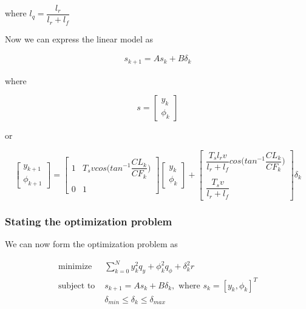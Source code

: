\documentclass[oneside,12pt]{article}
\begin{document}
    where $l_q = \dfrac{l_r}{l_r + l_f}$




  Now we can express the linear model as

    \begin{align}
      s_{k+1} = A s_k + B \delta_k
    \end{align}

    where

    \begin{equation}
      s=
      \begin{bmatrix}
        y_{k} \\
        \phi_{k}
      \end{bmatrix}
    \end{equation}

    or

    \begin{equation}
      \begin{bmatrix}
        y_{k+1} \\
        \phi_{k+1}
      \end{bmatrix}
      =
      \begin{bmatrix}
        1 & T_s v cos\Big(tan^{-1}\dfrac{CL_k}{CF_k}\Big) \\\\
        0 & 1
      \end{bmatrix}
      \begin{bmatrix}
        y_{k} \\
        \phi_{k}
      \end{bmatrix}
      +
      \begin{bmatrix}
        \dfrac{T_s l_r v}{l_r + l_f} cos\Big(tan^{-1}\dfrac{CL_k}{CF_k}\Big) \\\\
        \dfrac{T_s v}{l_r+l_f}
      \end{bmatrix}
      \delta_{k}
    \end{equation}

    \subsubsection{Stating the optimization problem}

    We can now form the optimization problem as

    \begin{align}
      \text{minimize } & \sum\limits_{k=0}^N y_k^2 q_y + \phi_k^2 q_{\phi} + \delta_k^2 r \\
      \text{subject to } & s_{k+1} = A s_k + B \delta_k,\text{ where } s_k = [y_k, \phi_k]^T \\
                        & \delta_{min} \leq \delta_k \leq \delta_{max}
    \end{align}
\end{document}
